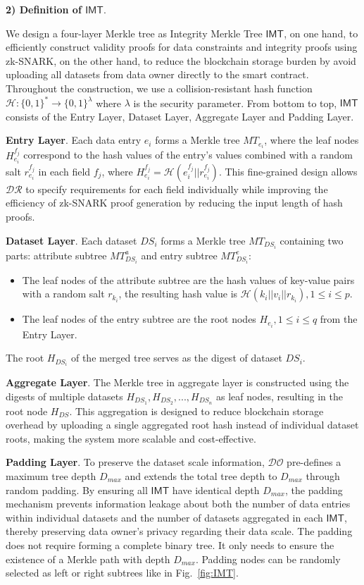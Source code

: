 \documentclass[journal]{IEEEtran}
\begin{document}
\textbf{2) Definition of $\mathsf{IMT}$}.

We design a four-layer Merkle tree as Integrity Merkle Tree $\mathsf{IMT}$, on one hand, to efficiently construct validity proofs for data constraints and integrity proofs using zk-SNARK, on the other hand, to reduce the blockchain storage burden by avoid uploading all datasets from data owner directly to the smart contract. Throughout the construction, we use a collision-resistant hash function $\mathcal{H}: \{0,1\}^* \rightarrow \{0,1\}^\lambda$ where $\lambda$ is the security parameter. From bottom to top, $\mathsf{IMT}$ consists of the Entry Layer, Dataset Layer, Aggregate Layer and Padding Layer.

\textbf{Entry Layer}. Each data entry $e_i$ forms a Merkle tree $MT_{e_i}$, where the leaf nodes ${H}_{e_i}^{f_j}$ correspond to the hash values of the entry's values combined with a random salt $r_{e_i}^{f_j}$ in each field $f_j$, where $H^{f_j}_{e_i} = \mathcal{H}(e_i^{f_j} || r_{e_i}^{f_j})$. This fine-grained design allows $\mathcal{DR}$ to specify requirements for each field individually while improving the efficiency of zk-SNARK proof generation by reducing the input length of hash proofs.

\textbf{Dataset Layer}. Each dataset $DS_i$ forms a Merkle tree $MT_{DS_i}$ containing two parts: attribute subtree $MT_{DS_i}^a$ and entry subtree $MT_{DS_i}^e$:
\begin{itemize}
    \item The leaf nodes of the attribute subtree are the hash values of key-value pairs with a random salt $r_{k_i}$, the resulting hash value is $\mathcal{H}(k_i || v_i || r_{k_i}), 1\leq i \leq p$.
    \item The leaf nodes of the entry subtree are the root nodes $H_{e_i}, 1\leq i \leq q$ from the Entry Layer.
\end{itemize}
The root $H_{DS_i}$ of the merged tree serves as the digest of dataset $DS_i$.

\textbf{Aggregate Layer}. The Merkle tree in aggregate layer is constructed using the digests of multiple datasets $H_{DS_1}, H_{DS_2}, ..., H_{DS_n}$ as leaf nodes, resulting in the root node $H_{DS}$. This aggregation is designed to reduce blockchain storage overhead by uploading a single aggregated root hash instead of individual dataset roots, making the system more scalable and cost-effective.

\textbf{Padding Layer}. To preserve the dataset scale information, $\mathcal{DO}$ pre-defines a maximum tree depth $D_{max}$ and extends the total tree depth to $D_{max}$ through random padding. By ensuring all $\mathsf{IMT}$ have identical depth $D_{max}$, the padding mechanism prevents information leakage about both the number of data entries within individual datasets and the number of datasets aggregated in each $\mathsf{IMT}$, thereby preserving data owner's privacy regarding their data scale. The padding does not require forming a complete binary tree. It only needs to ensure the existence of a Merkle path with depth $D_{max}$. Padding nodes can be randomly selected as left or right subtrees like in Fig.~\ref{fig:IMT}.
\end{document}
